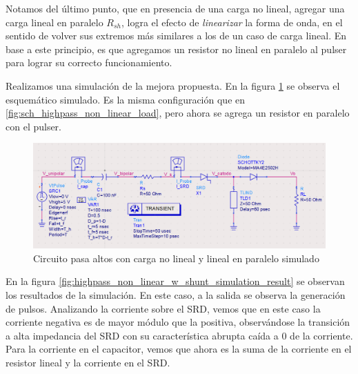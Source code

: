 Notamos del último punto, que en presencia de una carga no lineal, agregar una
carga lineal en paralelo $R_{sh}$, logra el efecto de \textit{linearizar} la
forma de onda, en el sentido de volver sus extremos más similares a los de un
caso de carga lineal.  En base a este principio, es que agregamos un resistor no
lineal en paralelo al pulser para lograr su correcto funcionamiento.

Realizamos una simulación de la mejora propuesta. En la figura
\ref{fig:sch_highpass_non_linear_w_shunt_simulation} se observa el esquemático
simulado. Es la misma configuración que en
\ref{fig:sch_highpass_non_linear_load}, pero ahora se  agrega un resistor en
paralelo con el pulser.

\begin{figure}[tbp]
    \centering
    \includegraphics[width=\textwidth]{images/highpass_nonlinear_w_shunt_sch.png}
    \caption{Circuito pasa altos con carga no lineal y lineal en paralelo simulado}
    \label{fig:sch_highpass_non_linear_w_shunt_simulation}
\end{figure}

En la figura \ref{fig:highpass_non_linear_w_shunt_simulation_result} se observan
los resultados de la simulación. En este caso, a la salida se observa la
generación de pulsos. Analizando la corriente sobre el SRD, vemos que en este
caso la corriente negativa es de mayor módulo que la positiva, observándose la
transición a alta impedancia del SRD con su característica abrupta caída a $0$
de la corriente. Para la corriente en el capacitor, vemos que ahora es la suma
de la corriente en el resistor lineal y la corriente en el SRD.


